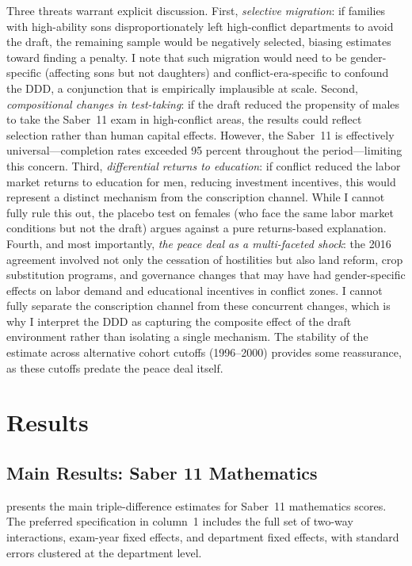\documentclass[12pt]{article}
\begin{document}
Three threats warrant explicit discussion. First, \textit{selective migration}: if families with high-ability sons disproportionately left high-conflict departments to avoid the draft, the remaining sample would be negatively selected, biasing estimates toward finding a penalty. I note that such migration would need to be gender-specific (affecting sons but not daughters) and conflict-era-specific to confound the DDD, a conjunction that is empirically implausible at scale. Second, \textit{compositional changes in test-taking}: if the draft reduced the propensity of males to take the Saber~11 exam in high-conflict areas, the results could reflect selection rather than human capital effects. However, the Saber~11 is effectively universal---completion rates exceeded 95 percent throughout the period---limiting this concern. Third, \textit{differential returns to education}: if conflict reduced the labor market returns to education for men, reducing investment incentives, this would represent a distinct mechanism from the conscription channel. While I cannot fully rule this out, the placebo test on females (who face the same labor market conditions but not the draft) argues against a pure returns-based explanation. Fourth, and most importantly, \textit{the peace deal as a multi-faceted shock}: the 2016 agreement involved not only the cessation of hostilities but also land reform, crop substitution programs, and governance changes that may have had gender-specific effects on labor demand and educational incentives in conflict zones. I cannot fully separate the conscription channel from these concurrent changes, which is why I interpret the DDD as capturing the composite effect of the draft environment rather than isolating a single mechanism. The stability of the estimate across alternative cohort cutoffs (1996--2000) provides some reassurance, as these cutoffs predate the peace deal itself.


\section{Results}

\subsection{Main Results: Saber 11 Mathematics}

 presents the main triple-difference estimates for Saber~11 mathematics scores. The preferred specification in column~1 includes the full set of two-way interactions, exam-year fixed effects, and department fixed effects, with standard errors clustered at the department level.
\end{document}
